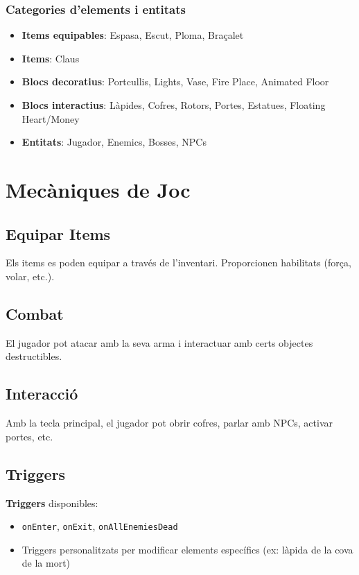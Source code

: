 \documentclass[a4paper,12pt]{article}
\begin{document}
\subsubsection{Categories d'elements i entitats}
\begin{itemize}
    \item \textbf{Items equipables}: Espasa, Escut, Ploma, Braçalet
    \item \textbf{Items}: Claus
    \item \textbf{Blocs decoratius}: Portcullis, Lights, Vase, Fire Place, Animated Floor
    \item \textbf{Blocs interactius}: Làpides, Cofres, Rotors, Portes, Estatues, Floating Heart/Money
    \item \textbf{Entitats}: Jugador, Enemics, Bosses, NPCs
\end{itemize}

\section{Mecàniques de Joc}

\subsection{Equipar Items}
Els items es poden equipar a través de l'inventari. Proporcionen habilitats (força, volar, etc.).

\subsection{Combat}
El jugador pot atacar amb la seva arma i interactuar amb certs objectes destructibles.

\subsection{Interacció}
Amb la tecla principal, el jugador pot obrir cofres, parlar amb NPCs, activar portes, etc.

\subsection{Triggers}
\textbf{Triggers} disponibles:
\begin{itemize}
    \item \texttt{onEnter}, \texttt{onExit}, \texttt{onAllEnemiesDead}
    \item Triggers personalitzats per modificar elements específics (ex: làpida de la cova de la mort)
\end{itemize}
\end{document}
